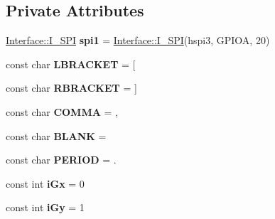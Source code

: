 \subsection*{Private Attributes}
\begin{DoxyCompactItemize}
\item 
\mbox{\label{classSensor_1_1ICM20689_acf60aeaeae5f2c527ff9a91065cfe418}} 
\mbox{\hyperlink{classInterface_1_1I__SPI}{Interface\+::\+I\+\_\+\+S\+PI}} {\bfseries spi1} = \mbox{\hyperlink{classInterface_1_1I__SPI}{Interface\+::\+I\+\_\+\+S\+PI}}(hspi3, G\+P\+I\+OA, 20)
\item 
\mbox{\label{classSensor_1_1ICM20689_a6605b9dc76fcdf0a7dd7450670b5d6c1}} 
const char {\bfseries L\+B\+R\+A\+C\+K\+ET} = \textquotesingle{}\mbox{[}\textquotesingle{}
\item 
\mbox{\label{classSensor_1_1ICM20689_a469c7adf7735d39e41a5437684bf4fc3}} 
const char {\bfseries R\+B\+R\+A\+C\+K\+ET} = \textquotesingle{}\mbox{]}\textquotesingle{}
\item 
\mbox{\label{classSensor_1_1ICM20689_ac28715e7a74b8c159ccfc6736fe01658}} 
const char {\bfseries C\+O\+M\+MA} = \textquotesingle{},\textquotesingle{}
\item 
\mbox{\label{classSensor_1_1ICM20689_a4f1471041dfdb7fe3dbbf6c987bbbd50}} 
const char {\bfseries B\+L\+A\+NK} = \textquotesingle{} \textquotesingle{}
\item 
\mbox{\label{classSensor_1_1ICM20689_aed62f09b02b4b2621edfdc08836f8895}} 
const char {\bfseries P\+E\+R\+I\+OD} = \textquotesingle{}.\textquotesingle{}
\item 
\mbox{\label{classSensor_1_1ICM20689_af490bf5e4b52db38aae78dba9c7234ef}} 
const int {\bfseries i\+Gx} = 0
\item 
\mbox{\label{classSensor_1_1ICM20689_a605351e88e171ed4e54503b50712a630}} 
const int {\bfseries i\+Gy} = 1
\item 
\mbox{\label{classSensor_1_1ICM20689_ad5af482a519d498e5563e14d1f32b6ad}} 

\end{DoxyCompactItemize}
